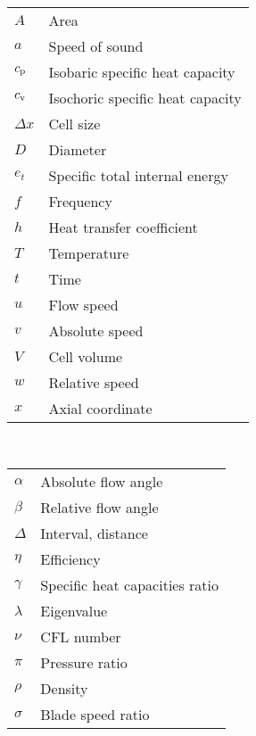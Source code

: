 
\par
\vspace{1cm}
\\
\begin{tabular}{@{}ll} %
    $A$ & Area \\
    $a$ & Speed of sound \\
    $c_\textnormal{p}$ & Isobaric specific heat capacity \\
    $c_\textnormal{v}$ & Isochoric specific heat capacity \\
    $\Delta x$ & Cell size \\
    $D$ & Diameter \\
    $e_t$ & Specific total internal energy \\
    $f$ & Frequency \\
    $h$ & Heat transfer coefficient \\
    $T$ & Temperature \\
    $t$ & Time \\
    $u$ & Flow speed \\
    $v$ & Absolute speed \\
    $V$ & Cell volume \\
    $w$ & Relative speed \\
    $x$ & Axial coordinate \\
\end{tabular}

\\
\begin{supertabular}{@{}ll} %
  $\alpha$ & Absolute flow angle \\
  $\beta$ & Relative flow angle \\
  $\Delta$ & Interval, distance \\
  $\eta$ & Efficiency \\
  $\gamma$ & Specific heat capacities ratio \\
  $\lambda$ & Eigenvalue \\
  $\nu$ & CFL number \\
  $\pi$ & Pressure ratio \\
  $\rho$ & Density \\
  $\sigma$ & Blade speed ratio \\
\end{supertabular}

